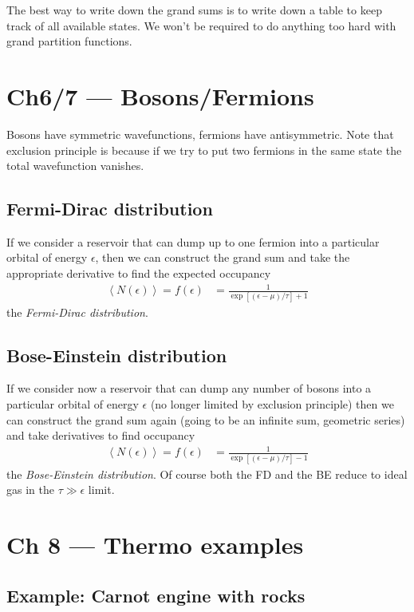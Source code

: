 \documentclass[10pt,twocolumn]{article}
\newcommand{\expvalue}[1]{\left<#1\right>}
\begin{document}
The best way to write down the grand sums is to write down a table to keep track of all available states. We won't be required to do anything too hard with grand partition functions.

\section{Ch6/7 --- Bosons/Fermions}

Bosons have symmetric wavefunctions, fermions have antisymmetric. Note that exclusion principle is because if we try to put two fermions in the same state the total wavefunction vanishes.

\subsection{Fermi-Dirac distribution}

If we consider a reservoir that can dump up to one fermion into a particular orbital of energy $\epsilon$, then we can construct the grand sum and take the appropriate derivative to find the expected occupancy
\begin{align}
    \expvalue{N(\epsilon)} = f(\epsilon) &= \frac{1}{\exp\left[ (\epsilon - \mu)/\tau \right] + 1}
\end{align}
the \emph{Fermi-Dirac distribution}. 

\subsection{Bose-Einstein distribution}

If we consider now a reservoir that can dump any number of bosons into a particular orbital of energy $\epsilon$ (no longer limited by exclusion principle) then we can construct the grand sum again (going to be an infinite sum, geometric series) and take derivatives to find occupancy
\begin{align}
    \expvalue{N(\epsilon)} = f(\epsilon) &= \frac{1}{\exp\left[ (\epsilon - \mu)/\tau \right] - 1}
\end{align}
the \emph{Bose-Einstein distribution}. Of course both the FD and the BE reduce to ideal gas in the $\tau \gg \epsilon$ limit. 
\section{Ch 8 --- Thermo examples}

\subsection{Example: Carnot engine with rocks}
\end{document}
